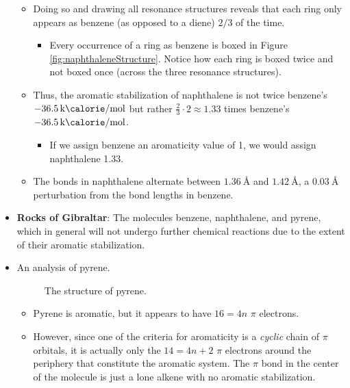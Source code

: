 \documentclass[../notes.tex]{subfiles}
\begin{document}
\begin{itemize}
\begin{itemize}
        \item Doing so and drawing all resonance structures reveals that each ring only appears as benzene (as opposed to a diene) $2/3$ of the time.
        \begin{itemize}
            \item Every occurrence of a ring as benzene is boxed in Figure \ref{fig:naphthaleneStructure}. Notice how each ring is boxed twice and not boxed once (across the three resonance structures).
        \end{itemize}
        \item Thus, the aromatic stabilization of naphthalene is not twice benzene's $\SI[per-mode=symbol]{-36.5}{\kilo\calorie\per\mole}$ but rather $\frac{2}{3}\cdot 2\approx 1.33$ times benzene's $\SI[per-mode=symbol]{-36.5}{\kilo\calorie\per\mole}$.
        \begin{itemize}
            \item If we assign benzene an aromaticity value of 1, we would assign naphthalene 1.33.
        \end{itemize}
        \item The bonds in naphthalene alternate between $\SI{1.36}{\angstrom}$ and $\SI{1.42}{\angstrom}$, a $\SI{0.03}{\angstrom}$ perturbation from the bond lengths in benzene.
    \end{itemize}
    \item \textbf{Rocks of Gibraltar}: The molecules benzene, naphthalene, and pyrene, which in general will not undergo further chemical reactions due to the extent of their aromatic stabilization.
    \item An analysis of pyrene.
    \begin{figure}[H]
        \centering
        \footnotesize
        \caption{The structure of pyrene.}
        \label{fig:pyreneStructure}
    \end{figure}
    \begin{itemize}
        \item Pyrene is aromatic, but it appears to have $16=4n$ $\pi$ electrons.
        \item However, since one of the criteria for aromaticity is a \emph{cyclic} chain of $\pi$ orbitals, it is actually only the $14=4n+2$ $\pi$ electrons around the periphery that constitute the aromatic system. The $\pi$ bond in the center of the molecule is just a lone alkene with no aromatic stabilization.

\end{itemize}
\end{itemize}
\end{document}
